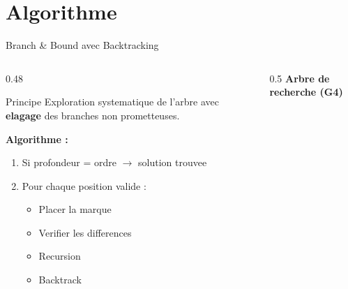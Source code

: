 \documentclass[aspectratio=169,9pt]{beamer}
\begin{document}
\section{Algorithme}

\begin{frame}[shrink=5]{Branch \& Bound avec Backtracking}
    \begin{columns}[T]
        \begin{column}{0.48\textwidth}
            \begin{block}{Principe}
                Exploration systematique de l'arbre avec \textbf{elagage} des branches non prometteuses.
            \end{block}
            \vspace{0.1cm}
            {\small\textbf{Algorithme :}}
            \begin{enumerate}\footnotesize
                \item Si profondeur = ordre $\rightarrow$ solution trouvee
                \item Pour chaque position valide :
                \begin{itemize}\footnotesize
                    \item Placer la marque
                    \item Verifier les differences
                    \item Recursion
                    \item Backtrack
                \end{itemize}
            \end{enumerate}
        \end{column}
        \begin{column}{0.5\textwidth}
            \centering
            \textbf{Arbre de recherche (G4)}\\[0.1cm]
\end{column}
\end{columns}
\end{frame}
\end{document}
